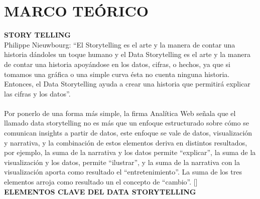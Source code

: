 \documentclass[preprint,12pt]{elsarticle}
\begin{document}
	\section{MARCO TEÓRICO}
	\textbf{ STORY TELLING}\\
	
	Philippe Nieuwbourg: “El Storytelling es el arte y la manera de contar una historia dándoles un toque humano y el Data Storytelling es el arte y la manera de contar una historia apoyándose en los datos, cifras, o hechos, ya que si tomamos una gráfica o una simple curva ésta no cuenta ninguna historia. Entonces, el Data Storytelling ayuda a crear una historia que permitirá explicar las cifras y los datos”. \\
	\\
	Por ponerlo de una forma más simple, la firma Analítica Web señala que el llamado data storytelling no es más que un enfoque estructurado sobre cómo se comunican insights a partir de datos, este enfoque se vale de datos, visualización y narrativa, y la combinación de estos elementos deriva en distintos resultados, por ejemplo, la suma de la narrativa y los datos permite “explicar”, la suma de la visualización y los datos, permite “ilustrar”, y la suma de la narrativa con la visualización aporta como resultado el “entretenimiento”. La suma de los tres elementos arroja como resultado un el concepto de “cambio”. []\\

\textbf{ELEMENTOS CLAVE DEL DATA STORYTELLING}\\
	
\end{document}
